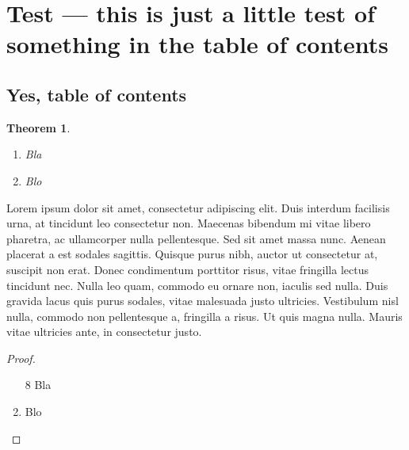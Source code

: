 \documentclass[twoside]{ctuthesis}
\theoremstyle{plain}
\newtheorem{theorem}{Theorem}[chapter]
\theoremstyle{definition}
\theoremstyle{note}
\begin{document}
\section{Test --- this is just a little test of something in the table of contents}

\subsection{Yes, table of contents}

\begin{theorem}\begin{enumerate} \item Bla \item Blo \end{enumerate} \end{theorem}


Lorem ipsum dolor sit amet, consectetur adipiscing elit. Duis interdum facilisis urna, at tincidunt leo consectetur non. Maecenas bibendum mi vitae libero pharetra, ac ullamcorper nulla pellentesque. Sed sit amet massa nunc. Aenean placerat a est sodales sagittis. Quisque purus nibh, auctor ut consectetur at, suscipit non erat. Donec condimentum porttitor risus, vitae fringilla lectus tincidunt nec. Nulla leo quam, commodo eu ornare non, iaculis sed nulla. Duis gravida lacus quis purus sodales, vitae malesuada justo ultricies. Vestibulum nisl nulla, commodo non pellentesque a, fringilla a risus. Ut quis magna nulla. Mauris vitae ultricies ante, in consectetur justo. 

\medskip

\begin{proof}\begin{enumerate} \item[8] Bla \item Blo \end{enumerate} \end{proof}

\appendix

\printindex

\appendix




\end{document}
